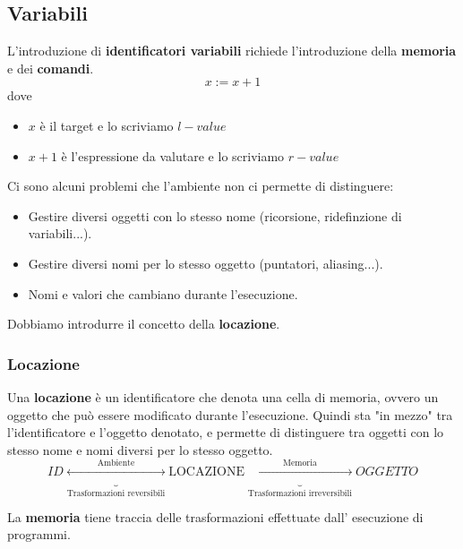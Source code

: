 \documentclass[a4paper]{article}
\begin{document}
\subsection{Variabili}

L'introduzione di \textbf{identificatori variabili} richiede l'introduzione della
\textbf{memoria} e dei \textbf{comandi}. 
\[
  x := x + 1
\]
dove 
\begin{itemize}
  \item $x$ è il target e lo scriviamo $l-value$ 
  \item $x + 1$ è l'espressione da valutare e lo scriviamo $r-value$
\end{itemize}
Ci sono alcuni problemi che l'ambiente non ci permette di distinguere:
\begin{itemize}
  \item Gestire diversi oggetti con lo stesso nome (ricorsione, ridefinzione di variabili...).
  \item Gestire diversi nomi per lo stesso oggetto (puntatori, aliasing...).
  \item Nomi e valori che cambiano durante l'esecuzione. 
\end{itemize}
Dobbiamo introdurre il concetto della \textbf{locazione}.

\subsubsection{Locazione}

Una \textbf{locazione} è un identificatore che denota una cella di memoria, 
ovvero un oggetto che può essere modificato durante l'esecuzione.
Quindi sta "in mezzo" tra l'identificatore e l'oggetto denotato, e permette di distinguere 
tra oggetti con lo stesso nome e nomi diversi per lo stesso oggetto.
\[
  ID \underbrace{\stackrel{\text{Ambiente}}{\longleftrightarrow}}_{\text{Trasformazioni reversibili}} \text{LOCAZIONE} \underbrace{\stackrel{\text{Memoria}}{\longleftrightarrow}}_{\text{Trasformazioni irreversibili}} OGGETTO
\]

{
  La \textbf{memoria} tiene traccia delle trasformazioni effettuate dall'
  esecuzione di programmi.   
}
\end{document}
